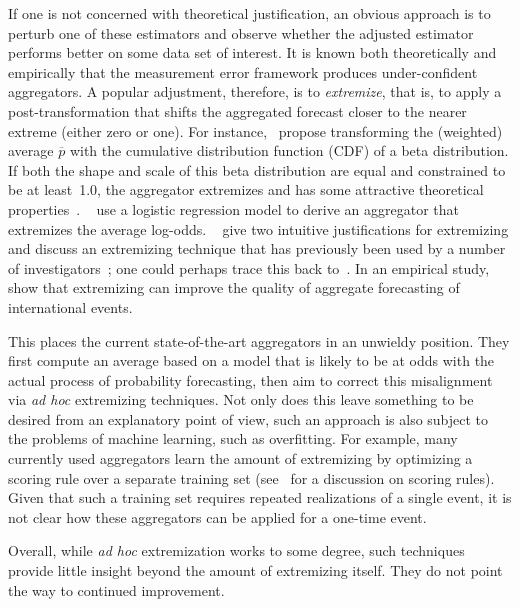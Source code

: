 \documentclass[11pt]{article}
\theoremstyle{definition}
\theoremstyle{definition}
\def\pb{\overline{p}}
\begin{document}
If one is not concerned with theoretical justification, an obvious
approach is to perturb one of these estimators and observe 
whether the adjusted estimator performs better on some data set
of interest.  It is known both theoretically and empirically
that the measurement error framework produces under-confident 
aggregators.  A popular adjustment, therefore, is to {\em extremize},
that is, to apply a post-transformation that shifts the 
aggregated forecast closer to the nearer extreme (either zero or one).
For instance,~\citet{Ranjan08} propose transforming
the (weighted) average $\pb$ with the cumulative distribution function
(CDF) of a beta distribution.  If both the shape and scale of this 
beta distribution are equal and constrained to be at least~1.0,
the aggregator extremizes and has some attractive theoretical
properties~\citep{Wallsten2001}.  ~\citet{satopaa}
use a logistic regression model to derive an aggregator that extremizes
the average log-odds.  ~\citet{baron2014two} give two intuitive
justifications for extremizing and discuss an extremizing technique
that has previously been used by a number of investigators~\citep{Erev1994,
shlomi2010subjective}; one could perhaps trace this back
to~\citet{karmarkar1978subjectively}.  
In an empirical study,~\citet{mellers2014psychological} show that 
extremizing can improve the quality of aggregate forecasting of 
international events.  

This places the current state-of-the-art aggregators in an unwieldy
position.  They first compute an average based on a model that
is likely to be at odds with the actual process of probability
forecasting, then aim to correct this misalignment via {\em ad hoc} 
extremizing techniques.  
%
Not only does this leave something to be desired from an explanatory 
point of view, such an approach is also subject to the problems of 
machine learning, such as overfitting.  For example, many currently
used aggregators learn the amount of extremizing by optimizing a scoring
rule over a separate training set (see~\citealt{Gneiting04strictlyproper} 
for a discussion on scoring rules).
Given that such a training set requires repeated realizations of
a single event, it is not clear how these aggregators can be applied
for a one-time event.  

Overall, while {\em ad hoc} extremization works to some degree, such
techniques provide little insight beyond the amount of extremizing
itself.  They do not point the way to continued improvement.
\end{document}
